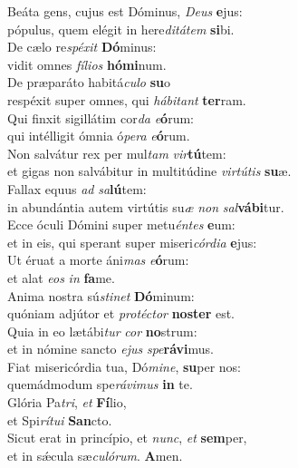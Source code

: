 \evenverse Beáta gens, cujus est Dóminus, \textit{De}\textit{us} \textbf{e}jus:~\*\\
\evenverse pópulus, quem elégit in here\textit{di}\textit{tá}\textit{tem} \textbf{si}bi.\\
\oddverse De cælo re\textit{spé}\textit{xit} \textbf{Dó}minus:~\*\\
\oddverse vidit omnes \textit{fí}\textit{li}\textit{os} \textbf{hó}\textbf{mi}num.\\
\evenverse De præparáto habitá\textit{cu}\textit{lo} \textbf{su}o~\*\\
\evenverse respéxit super omnes, qui \textit{há}\textit{bi}\textit{tant} \textbf{ter}ram.\\
\oddverse Qui finxit sigillátim cor\textit{da} \textit{e}\textbf{ó}rum:~\*\\
\oddverse qui intélligit ómnia ó\textit{pe}\textit{ra} \textit{e}\textbf{ó}rum.\\
\evenverse Non salvátur rex per mul\textit{tam} \textit{vir}\textbf{tú}tem:~\*\\
\evenverse et gigas non salvábitur in multitúdine \textit{vir}\textit{tú}\textit{tis} \textbf{su}æ.\\
\oddverse Fallax equus \textit{ad} \textit{sa}\textbf{lú}tem:~\*\\
\oddverse in abundántia autem virtútis su\textit{æ} \textit{non} \textit{sal}\textbf{vá}\textbf{bi}tur.\\
\evenverse Ecce óculi Dómini super metu\textit{én}\textit{tes} \textbf{e}um:~\*\\
\evenverse et in eis, qui sperant super miseri\textit{cór}\textit{di}\textit{a} \textbf{e}jus:\\
\oddverse Ut éruat a morte áni\textit{mas} \textit{e}\textbf{ó}rum:~\*\\
\oddverse et alat \textit{e}\textit{os} \textit{in} \textbf{fa}me.\\
\evenverse Anima nostra sú\textit{sti}\textit{net} \textbf{Dó}minum:~\*\\
\evenverse quóniam adjútor et \textit{pro}\textit{té}\textit{ctor} \textbf{no}\textbf{ster} est.\\
\oddverse Quia in eo lætábi\textit{tur} \textit{cor} \textbf{no}strum:~\*\\
\oddverse et in nómine sancto \textit{e}\textit{jus} \textit{spe}\textbf{rá}\textbf{vi}mus.\\
\evenverse Fiat misericórdia tua, Dó\textit{mi}\textit{ne}, \textbf{su}per nos:~\*\\
\evenverse quemádmodum spe\textit{rá}\textit{vi}\textit{mus} \textbf{in} te.\\
\oddverse Glória Pa\textit{tri}, \textit{et} \textbf{Fí}lio,~\*\\
\oddverse et Spi\textit{rí}\textit{tu}\textit{i} \textbf{San}cto.\\
\evenverse Sicut erat in princípio, et \textit{nunc}, \textit{et} \textbf{sem}per,~\*\\
\evenverse et in sǽcula sæ\textit{cu}\textit{ló}\textit{rum}. \textbf{A}men.\\
